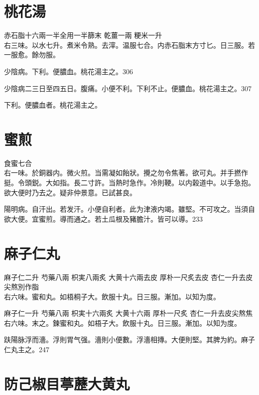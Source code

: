 \section{桃花湯}

赤石脂{\scriptsize 十六兩一半全用一半篩末} 乾薑{\scriptsize 一兩} 粳米{\scriptsize 一升}\\
右三味。以水七升。煮米令熟。去滓。温服七合。内赤石脂末方寸匕。日三服。若一服愈。餘勿服。

少陰病。下利。便膿血。桃花湯主之。306

少陰病二三日至四五日。腹痛。小便不利。下利不止。便膿血。桃花湯主之。307

下利。便膿血者。桃花湯主之。

\section{蜜煎}

食蜜{\scriptsize 七合}\\
右一味。於銅器内。微火煎。当需凝如飴狀。攪之勿令焦著。欲可丸。并手撚作挺。令頭鋭。大如指。長二寸許。当熱时急作。冷則鞕。以内榖道中。以手急抱。欲大便时乃去之。疑非仲景意。已試甚良。

陽明病。{\khaai 自}汗出。若发汗。小便自利者。此为{\khaai 津液}内竭。雖堅。不可攻之。当須自欲大便。宜蜜煎。導而通之。若土瓜根及豬膽汁。皆可以導。233

\section{麻子仁丸}

麻子仁{\scriptsize 二升} 芍藥{\scriptsize 八兩} 枳実{\scriptsize 八兩炙} 大黄{\scriptsize 十六兩去皮} 厚朴{\scriptsize 一尺炙去皮} 杏仁{\scriptsize 一升去皮尖熬別作脂}\\
右六味。蜜和丸。如梧桐子大。飲服十丸。日三服。漸加。以知为度。{\zhaoben}

麻子仁{\scriptsize 一升} 芍藥{\scriptsize 八兩} 枳実{\scriptsize 十六兩炙} 大黄{\scriptsize 十六兩} 厚朴{\scriptsize 一尺炙} 杏仁{\scriptsize 一升去皮尖熬焦}\\
右六味。末之。鍊蜜和丸。如梧子大。飲服十丸。日三服。漸加。以知为度。{\wuben}

趺陽脉浮而濇。浮則胃气强。濇則小便數。浮濇相摶。大便則堅。其脾为約。麻子仁丸主之。247

\section{防己椒目葶藶大黄丸}

